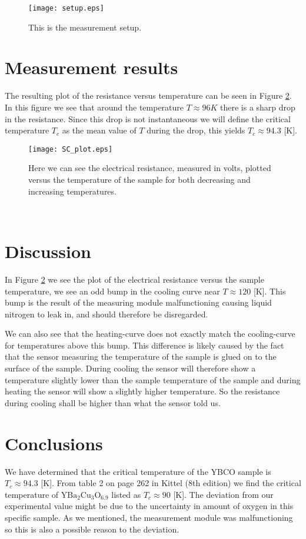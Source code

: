 \documentclass[a4paper]{article}
\begin{document}
\begin{figure}
\centering
\texttt{[image: setup.eps]}
\caption{\label{setup} This is the measurement setup.}
\end{figure}

\section{Measurement results}

The resulting plot of the resistance versus temperature can be seen in Figure \ref{res_plot}. In this figure we see that around the temperature $T \approx 96 K$ there is a sharp drop in the resistance. Since this drop is not instantaneous we will define the critical temperature $T_c$ as the mean value of $T$ during the drop, this yields $T_c \approx 94.3$ [K].

\begin{figure}
\centering
\texttt{[image: SC\_plot.eps]}
\caption{\label{res_plot}Here we can see the electrical resistance, measured in volts, plotted versus the temperature of the sample for both decreasing and increasing temperatures.}
\end{figure}
\
\section{Discussion}

In Figure \ref{res_plot} we see the plot of the electrical resistance versus the sample temperature, we see an odd bump in the cooling curve near $T \approx 120$ [K]. This bump is the result of the measuring module malfunctioning causing liquid nitrogen to leak in, and should therefore be disregarded.

We can also see that the heating-curve does not exactly match the cooling-curve for temperatures above this bump. This difference is likely caused by the fact that the sensor measuring the temperature of the sample is glued on to the surface of the sample. During cooling the sensor will therefore show a temperature slightly lower than the sample temperature of the sample and during heating the sensor will show a slightly higher temperature. So the resistance during cooling shall be higher than what the sensor told us. 

\section{Conclusions}

We have determined that the critical temperature of the YBCO sample is $T_c \approx 94.3$ [K]. From table 2 on page 262 in Kittel (8th edition) we find the critical temperature of $\mathrm{YBa_2Cu_3O_{6.9}}$ listed as $T_c \approx 90$ [K]. The deviation from our experimental value might be due to the uncertainty in amount of oxygen in this specific sample. As we mentioned, the measurement module was malfunctioning so this is also a possible reason to the deviation. 
\end{document}
